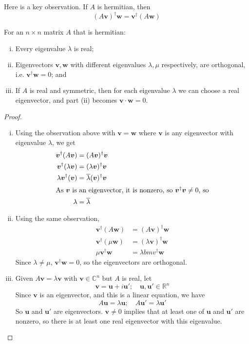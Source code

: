 \documentclass{article}
\begin{document}
	Here is a key observation. If $A$ is hermitian, then
	\[ (A\bm v)^\dagger \bm w = \bm v^\dagger (A \bm w) \]
	\begin{theorem}
		For an $n \times n$ matrix $A$ that is hermitian:
		\begin{enumerate}[(i)]
			\item Every eigenvalue $\lambda$ is real;
			\item Eigenvectors $\bm v, \bm w$ with different eigenvalues $\lambda, \mu$ respectively, are orthogonal, i.e. $\bm v^\dagger \bm w = 0$; and
			\item If $A$ is real and symmetric, then for each eigenvalue $\lambda$ we can choose a real eigenvector, and part (ii) becomes $\bm v \cdot \bm w = 0$.
		\end{enumerate}
	\end{theorem}
	\begin{proof}
		\begin{enumerate}[(i)]
			\item Using the observation above with $\bm v = \bm w$ where $\bm v$ is any eigenvector with eigenvalue $\lambda$, we get
			\begin{align*}
				\bm v^\dagger (A\bm v) &= (A\bm v)^\dagger \bm v \\
				\bm v^\dagger (\lambda\bm v) &= (\lambda\bm v)^\dagger \bm v \\
				\lambda \bm v^\dagger (\bm v) &= \overline{\lambda} (\bm v)^\dagger \bm v \\
				\intertext{As $\bm v$ is an eigenvector, it is nonzero, so $\bm v^\dagger \bm v \neq 0$, so}
				\lambda &= \overline \lambda
			\end{align*}
			\item Using the same observation,
			\begin{align*}
				\bm v^\dagger (A \bm w) &= (A \bm v)^\dagger \bm w \\
				\bm v^\dagger (\mu \bm w) &= (\lambda \bm v)^\dagger \bm w \\
				\mu \bm v^\dagger \bm w &= \lambda bm v^\dagger \bm w
			\end{align*}
			Since $\lambda \neq \mu$, $\bm v^\dagger \bm w = 0$, so the eigenvectors are orthogonal.
			\item Given $A\bm v = \lambda \bm v$ with $\bm v \in \mathbb C^n$ but $A$ is real, let
			\[ \bm v = \bm u + i\bm u';\quad \bm u, \bm u' \in \mathbb R^n \]
			Since $\bm v$ is an eigenvector, and this is a linear equation, we have
			\[ A\bm u = \lambda \bm u;\quad A\bm u' = \lambda \bm u' \]
			So $\bm u$ and $\bm u'$ are eigenvectors. $\bm v \neq 0$ implies that at least one of $\bm u$ and $\bm u'$ are nonzero, so there is at least one real eigenvector with this eigenvalue.
		\end{enumerate}
	\end{proof}
\end{document}
